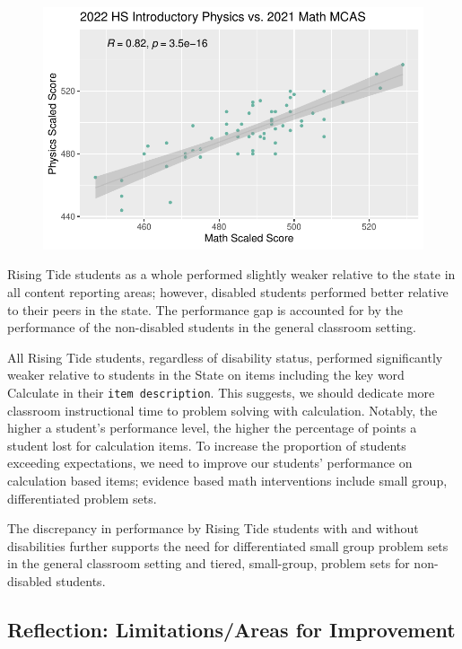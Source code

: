 \documentclass[
  letterpaper,
  DIV=11,
  numbers=noendperiod]{scrartcl}
\begin{document}
\begin{figure}[H]

{\centering \includegraphics{theresaSzczepanski_final_files/figure-pdf/unnamed-chunk-31-1.pdf}

}

\end{figure}

Rising Tide students as a whole performed slightly weaker relative to
the state in all content reporting areas; however, disabled students
performed better relative to their peers in the state. The performance
gap is accounted for by the performance of the non-disabled students in
the general classroom setting.

All Rising Tide students, regardless of disability status, performed
significantly weaker relative to students in the State on items
including the key word Calculate in their \texttt{item\ description}.
This suggests, we should dedicate more classroom instructional time to
problem solving with calculation. Notably, the higher a student's
performance level, the higher the percentage of points a student lost
for calculation items. To increase the proportion of students exceeding
expectations, we need to improve our students' performance on
calculation based items; evidence based math interventions include small
group, differentiated problem sets.

The discrepancy in performance by Rising Tide students with and without
disabilities further supports the need for differentiated small group
problem sets in the general classroom setting and tiered, small-group,
problem sets for non-disabled students.

\hypertarget{reflection-limitationsareas-for-improvement}{%
\subsection{Reflection: Limitations/Areas for
Improvement}\label{reflection-limitationsareas-for-improvement}}
\end{document}
